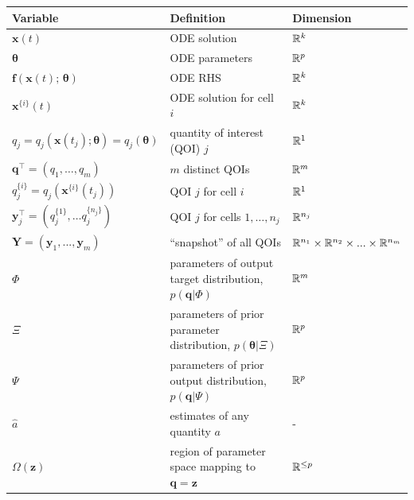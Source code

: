 \begin{table}[htbp]
\centering
\begin{adjustwidth}{-0.6in}{0in}%
\begin{tabularx}{1.2\textwidth}{lll}
Variable	                                                & Definition                                   & Dimension \\
\toprule
$\boldsymbol{x}(t)$                                     	& ODE solution                                 & $\mathbb{R}^k$ \\
$\boldsymbol{\theta}$                                     	& ODE parameters                               & $\mathbb{R}^p$ \\
$\boldsymbol{f}(\boldsymbol{x}(t); \, \boldsymbol{\theta})$	& ODE RHS                                      & $\mathbb{R}^k$ \\
$\boldsymbol{x}^{\{i\}}(t)$                                 & ODE solution for cell $i$                    & $\mathbb{R}^k$ \\
$q_j= q_j(\boldsymbol{x}(t_j);\boldsymbol{\theta}) = q_j(\boldsymbol{\theta})$                             & quantity of interest (QOI) $j$               & $\mathbb{R}^1$ \\
$\boldsymbol{q}^\top= \left( q_1, \dots, q_m \right)$            & $m$ distinct QOIs                            & $\mathbb{R}^m$ \\
$q_j^{\{i\}}= q_j(\boldsymbol{x}^{\{i\}}(t_j))$             & QOI $j$ for cell $i$                         & $\mathbb{R}^1$ \\
$\boldsymbol{y}_j^\top=\left( q_j^{\{1\}}, \dots q_j^{\{n_j\}} \right)$  & QOI $j$ for cells $1, \dots, n_j$    & $\mathbb{R}^{n_j}$ \\
$\boldsymbol{Y}=(\boldsymbol{y}_1,...,\boldsymbol{y}_m)$    & ``snapshot'' of all QOIs                      & $\mathbb{R}^{n_1} \times \mathbb{R}^{n_2}\times...\times\mathbb{R}^{n_m}$ \\
$\Phi$ & parameters of output target distribution, $p(\boldsymbol{q}|\Phi)$              & $\mathbb{R}^m$ \\
$\Xi$  & parameters of prior parameter distribution, $p(\boldsymbol{\theta}|\Xi)$        & $\mathbb{R}^p$ \\
$\Psi$ & parameters of prior output distribution, $p(\boldsymbol{q}|\Psi)$               & $\mathbb{R}^p$ \\
$\hat{a}$ & estimates of any quantity $a$                                                                  & - \\
$\Omega(\boldsymbol{z})$              & region of parameter space mapping to $\boldsymbol{q}=\boldsymbol{z}$         & $\mathbb{R}^{\leq p}$ \\

\end{tabularx}
\end{adjustwidth}
\end{table}
